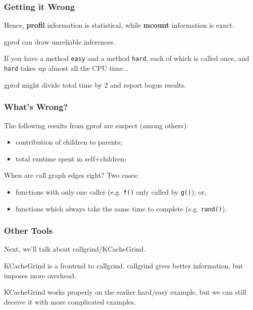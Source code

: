 \begin{frame}
  \frametitle{Getting it Wrong}

Hence, {\bf profil} information is statistical, while {\bf mcount}
information is exact.  

gprof can draw unreliable inferences. 

If you have a method \texttt{easy} and a method \texttt{hard}, each of which is called once, and \texttt{hard} takes up almost all the CPU time...


gprof might divide total time by 2 and report bogus results.

\end{frame}

\begin{frame}[fragile]
  \frametitle{What's Wrong?}

The following results from gprof are suspect (among others):

\begin{itemize}
  \item contribution of children to parents;
  \item total runtime spent in self+children;
\end{itemize}


When are call graph edges right?
Two cases:

    \begin{itemize}
    \item functions with only one caller
      (e.g. {\tt f()} only called by {\tt g()}); or,
    \item functions which always take the same time to complete
      (e.g. {\tt rand()}).
    \end{itemize}


\end{frame}


\begin{frame}
\frametitle{Other Tools}

Next, we'll talk about callgrind/KCacheGrind.

KCacheGrind is a frontend to callgrind. callgrind gives better information, but imposes more overhead.


KCacheGrind works properly on the earlier hard/easy example, but we can still deceive it with more complicated examples.

\end{frame}


